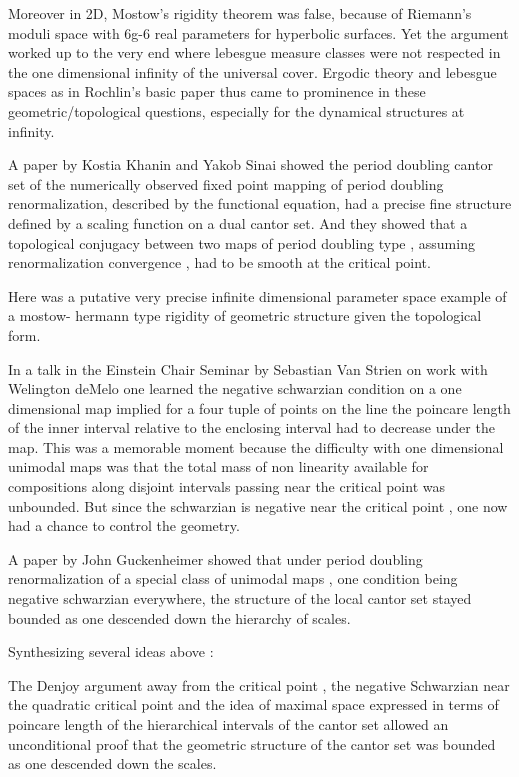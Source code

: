 \begin{description}
Moreover in 2D,  Mostow's  rigidity theorem  was false, because of Riemann's moduli space with  6g-6 real parameters for hyperbolic surfaces.  Yet  the argument worked up to the very end where lebesgue measure classes were not respected in the one dimensional infinity of the universal cover.  Ergodic theory  and lebesgue spaces as in Rochlin's  basic paper   thus came to prominence in these geometric/topological questions, especially  for  the dynamical structures at infinity.

  A paper by   Kostia Khanin and Yakob Sinai  showed the period doubling cantor set of the numerically observed fixed point mapping  of period doubling renormalization, described by the functional equation,  had a precise fine structure defined by a scaling function on a dual cantor set. And they showed  that a  topological conjugacy between two maps of period doubling type , assuming renormalization convergence , had to be smooth at the critical point.

Here was  a  putative  very precise  infinite dimensional parameter space  example of  a mostow- hermann type rigidity of geometric structure given the topological form.


In a talk in the Einstein Chair Seminar by  Sebastian Van Strien on work with  Welington deMelo  one  learned the negative schwarzian condition on a one dimensional map  implied for a four tuple of points on the line the poincare length of the inner interval relative to the enclosing interval  had to decrease under the map.  This was a memorable moment because the difficulty with one dimensional unimodal maps was  that the  total mass of non linearity available  for compositions along disjoint intervals  passing near the critical point was unbounded. But since the  schwarzian is negative near the critical point , one  now had  a chance to control the geometry.

 A  paper by John Guckenheimer showed that  under  period doubling renormalization of a special class of unimodal maps ,  one condition being negative schwarzian everywhere, the structure of the local cantor set stayed  bounded as one descended down the hierarchy of scales.

 Synthesizing several ideas above :

 The Denjoy argument away from the critical point ,   the negative Schwarzian near the quadratic critical point   and  the idea of  maximal  space  expressed in terms of  poincare length  of  the  hierarchical intervals of the cantor set  allowed  an unconditional  proof that the geometric structure of the cantor set was bounded as one descended down the scales.


\end{description}
